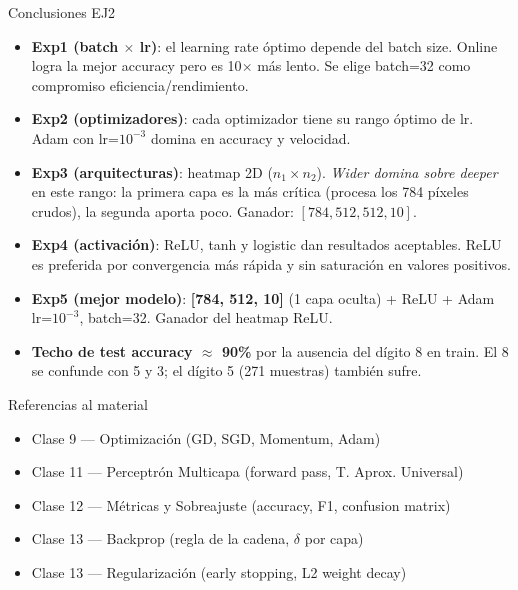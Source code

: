 \documentclass[aspectratio=169,10pt]{beamer}
\begin{document}
\begin{frame}{Conclusiones EJ2}
  \begin{itemize}
    \item \textbf{Exp1 (batch $\times$ lr)}: el learning rate óptimo depende
      del batch size. Online logra la mejor accuracy pero es 10$\times$ más
      lento. Se elige batch=32 como compromiso eficiencia/rendimiento.
    \item \textbf{Exp2 (optimizadores)}: cada optimizador tiene su rango
      óptimo de lr. Adam con lr=$10^{-3}$ domina en accuracy y velocidad.
    \item \textbf{Exp3 (arquitecturas)}: heatmap 2D ($n_1 \times n_2$).
      \emph{Wider domina sobre deeper} en este rango: la primera capa es
      la más crítica (procesa los 784 píxeles crudos), la segunda aporta
      poco. Ganador: $[784, 512, 512, 10]$.
    \item \textbf{Exp4 (activación)}: ReLU, tanh y logistic dan resultados
      aceptables. ReLU es preferida por convergencia más rápida y sin
      saturación en valores positivos.
    \item \textbf{Exp5 (mejor modelo)}: \textbf{[784, 512, 10]} (1 capa oculta) + ReLU + Adam
      lr=$10^{-3}$, batch=32. Ganador del heatmap ReLU.
    \item \textbf{Techo de test accuracy $\approx$ 90\%} por la ausencia
      del dígito 8 en train. El 8 se confunde con 5 y 3; el dígito 5
      (271 muestras) también sufre.
  \end{itemize}
\end{frame}

\begin{frame}{Referencias al material}
  \begin{itemize}
    \item Clase 9 — Optimización (GD, SGD, Momentum, Adam)
    \item Clase 11 — Perceptrón Multicapa (forward pass, T. Aprox. Universal)
    \item Clase 12 — Métricas y Sobreajuste (accuracy, F1, confusion matrix)
    \item Clase 13 — Backprop (regla de la cadena, $\delta$ por capa)
    \item Clase 13 — Regularización (early stopping, L2 weight decay)
  \end{itemize}
\end{frame}
\end{document}
